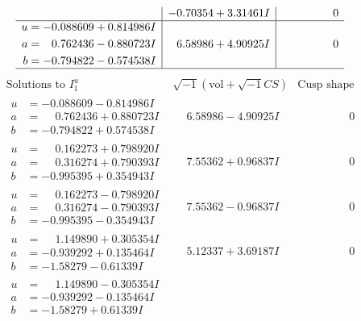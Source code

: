 \documentclass[1p]{elsarticle_modified}
\theoremstyle{definition}
\newcommand{\I}{\sqrt{-1}}
\begin{document}
$$\begin{array}{c|c|c}
 & -0.70354 + 3.31461 I & \phantom{-0.000000 } 0 \\ \hline\begin{aligned}
u &= -0.088609 + 0.814986 I \\
a &= \phantom{-}0.762436 - 0.880723 I \\
b &= -0.794822 - 0.574538 I\end{aligned}
 & \phantom{-}6.58986 + 4.90925 I & \phantom{-0.000000 } 0\\
 \hline 
 \end{array}$$\newpage$$\begin{array}{c|c|c}  
\text{Solutions to }I^u_{1}& \I (\text{vol} + \sqrt{-1}CS) & \text{Cusp shape}\\
 \hline 
\begin{aligned}
u &= -0.088609 - 0.814986 I \\
a &= \phantom{-}0.762436 + 0.880723 I \\
b &= -0.794822 + 0.574538 I\end{aligned}
 & \phantom{-}6.58986 - 4.90925 I & \phantom{-0.000000 } 0 \\ \hline\begin{aligned}
u &= \phantom{-}0.162273 + 0.798920 I \\
a &= \phantom{-}0.316274 + 0.790393 I \\
b &= -0.995395 + 0.354943 I\end{aligned}
 & \phantom{-}7.55362 + 0.96837 I & \phantom{-0.000000 } 0 \\ \hline\begin{aligned}
u &= \phantom{-}0.162273 - 0.798920 I \\
a &= \phantom{-}0.316274 - 0.790393 I \\
b &= -0.995395 - 0.354943 I\end{aligned}
 & \phantom{-}7.55362 - 0.96837 I & \phantom{-0.000000 } 0 \\ \hline\begin{aligned}
u &= \phantom{-}1.149890 + 0.305354 I \\
a &= -0.939292 + 0.135464 I \\
b &= -1.58279 - 0.61339 I\end{aligned}
 & \phantom{-}5.12337 + 3.69187 I & \phantom{-0.000000 } 0 \\ \hline\begin{aligned}
u &= \phantom{-}1.149890 - 0.305354 I \\
a &= -0.939292 - 0.135464 I \\
b &= -1.58279 + 0.61339 I\end{aligned}

\end{array}$$
\end{document}
